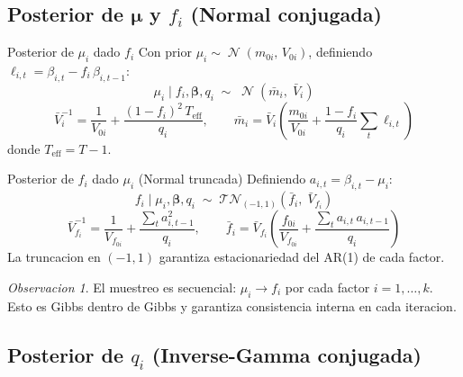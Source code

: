 \documentclass[12pt, a4paper]{article}
\theoremstyle{plain}
\theoremstyle{definition}
\theoremstyle{remark}
\newtheorem{observacion}{Observacion}[section]
\newcommand{\bbet}{\bm{\beta}}
\newcommand{\bmu}{\bm{\mu}}
\DeclareMathOperator{\N}{\mathcal{N}}
\newcommand{\TN}{\mathcal{TN}}
\begin{document}
\subsection{\texorpdfstring{Posterior de $\bmu$ y $f_i$ (Normal conjugada)}{Posterior de mu y f_i (Normal conjugada)}}

\begin{teoremabox}{Posterior de $\mu_i$ dado $f_i$}
Con prior $\mu_i \sim \N(m_{0i},\, V_{0i})$,
definiendo $\ell_{i,t} = \beta_{i,t} - f_i\,\beta_{i,t-1}$:
\begin{equation}
  \mu_i \mid f_i, \bbet, q_i \;\sim\; \N\!\left(\bar{m}_i,\; \bar{V}_i\right)
\end{equation}
\begin{equation}
  \bar{V}_i^{-1} = \frac{1}{V_{0i}} + \frac{(1-f_i)^2\,T_\text{eff}}{q_i},
  \qquad
  \bar{m}_i = \bar{V}_i\!\left(
    \frac{m_{0i}}{V_{0i}} + \frac{1-f_i}{q_i}\sum_t \ell_{i,t}
  \right)
  \label{eq:post_mu}
\end{equation}
donde $T_\text{eff} = T-1$.
\end{teoremabox}

\begin{teoremabox}{Posterior de $f_i$ dado $\mu_i$ (Normal truncada)}
Definiendo $a_{i,t} = \beta_{i,t} - \mu_i$:
\begin{equation}
  f_i \mid \mu_i, \bbet, q_i \;\sim\;
  \TN_{(-1,1)}\!\left(\bar{f}_i,\;\bar{V}_{f_i}\right)
\end{equation}
\begin{equation}
  \bar{V}_{f_i}^{-1} = \frac{1}{V_{f_{0i}}} + \frac{\sum_t a_{i,t-1}^2}{q_i},
  \qquad
  \bar{f}_i = \bar{V}_{f_i}\!\left(
    \frac{f_{0i}}{V_{f_{0i}}} + \frac{\sum_t a_{i,t}\,a_{i,t-1}}{q_i}
  \right)
  \label{eq:post_f}
\end{equation}
La truncacion en $(-1,1)$ garantiza estacionariedad del AR(1) de cada factor.
\end{teoremabox}

\begin{observacion}
El muestreo es secuencial: $\mu_i \to f_i$ por cada factor $i = 1,\ldots,k$.
Esto es Gibbs dentro de Gibbs y garantiza consistencia interna en cada iteracion.
\end{observacion}

\subsection{Posterior de $q_i$ (Inverse-Gamma conjugada)}
\end{document}
